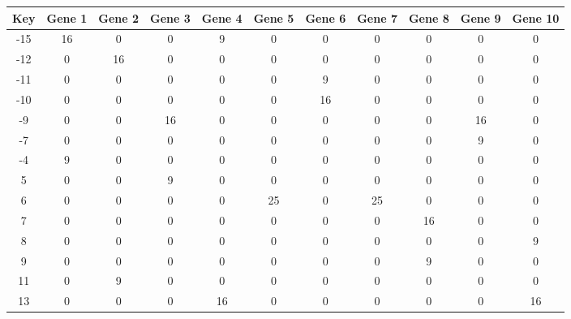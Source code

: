 \begin{tabular}{|c|c|c|c|c|c|c|c|c|c|c|}
\hline
Key & Gene 1 & Gene 2 & Gene 3 & Gene 4 & Gene 5 & Gene 6 & Gene 7 & Gene 8 & Gene 9 & Gene 10 \\
\hline
-15 & 16 & 0 & 0 & 9 & 0 & 0 & 0 & 0 & 0 & 0 \\
-12 & 0 & 16 & 0 & 0 & 0 & 0 & 0 & 0 & 0 & 0 \\
-11 & 0 & 0 & 0 & 0 & 0 & 9 & 0 & 0 & 0 & 0 \\
-10 & 0 & 0 & 0 & 0 & 0 & 16 & 0 & 0 & 0 & 0 \\
-9 & 0 & 0 & 16 & 0 & 0 & 0 & 0 & 0 & 16 & 0 \\
-7 & 0 & 0 & 0 & 0 & 0 & 0 & 0 & 0 & 9 & 0 \\
-4 & 9 & 0 & 0 & 0 & 0 & 0 & 0 & 0 & 0 & 0 \\
5 & 0 & 0 & 9 & 0 & 0 & 0 & 0 & 0 & 0 & 0 \\
6 & 0 & 0 & 0 & 0 & 25 & 0 & 25 & 0 & 0 & 0 \\
7 & 0 & 0 & 0 & 0 & 0 & 0 & 0 & 16 & 0 & 0 \\
8 & 0 & 0 & 0 & 0 & 0 & 0 & 0 & 0 & 0 & 9 \\
9 & 0 & 0 & 0 & 0 & 0 & 0 & 0 & 9 & 0 & 0 \\
11 & 0 & 9 & 0 & 0 & 0 & 0 & 0 & 0 & 0 & 0 \\
13 & 0 & 0 & 0 & 16 & 0 & 0 & 0 & 0 & 0 & 16 \\
\hline
\end{tabular}